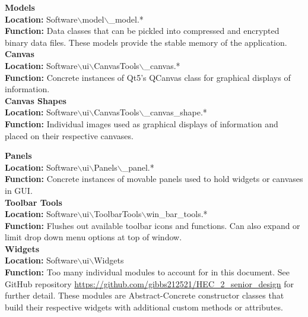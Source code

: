 \documentclass[12pt]{article}
\newcommand{\cross}[1][1pt]{\ooalign{ 	%
  \rule[1ex]{1ex}{#1}\cr%
  \hss\rule{#1}{.7em}\hss\cr}}%
\begin{document}
 \noindent
\textbf{
Models\\
Location: }
Software$\backslash$model$\backslash$\cross[0.4pt]\cross[0.4pt]\cross[0.4pt]\_model.*\\
\textbf{
Function: }
Data classes that can be pickled into compressed and encrypted binary data files.  These models provide the stable memory of the application.\\
 
 \noindent
\textbf{
Canvas\\
Location: }
Software$\backslash$ui$\backslash$CanvasTools$\backslash$\cross[0.4pt]\cross[0.4pt]\cross[0.4pt]\_canvas.*\\
\textbf{
Function: }
Concrete instances of Qt5’s QCanvas class for graphical displays of information.\\
 
 \noindent
\textbf{
Canvas Shapes\\
Location: }
Software$\backslash$ui$\backslash$CanvasTools$\backslash$\cross[0.4pt]\cross[0.4pt]\cross[0.4pt]\_canvas\_shape.*\\
\textbf{
Function: }
Individual images used as graphical displays of information and placed on their respective canvases.
\hfill
\pagebreak
\hfill
 
 \noindent
\textbf{
Panels\\
Location: }
Software$\backslash$ui$\backslash$Panels$\backslash$\cross[0.4pt]\cross[0.4pt]\cross[0.4pt]\_panel.*\\
\textbf{
Function: }
Concrete instances of movable panels used to hold widgets or canvases in GUI.\\
 
 \noindent
\textbf{
Toolbar Tools\\
Location: }
Software$\backslash$ui$\backslash$ToolbarTools$\backslash$win\_bar\_tools.*\\
\textbf{
Function: }
Flushes out available toolbar icons and functions.  Can also expand or limit drop down menu options at top of window.\\
 
 \noindent
\textbf{
Widgets\\
Location: }
Software$\backslash$ui$\backslash$Widgets\\
\textbf{
Function: }
Too many individual modules to account for in this document.  See GitHub repository \url{https://github.com/gibbs212521/HEC\_2_senior_design} for further detail.  These modules are Abstract-Concrete constructor classes that build their respective widgets with additional custom methods or attributes.\\
 
\end{document}
